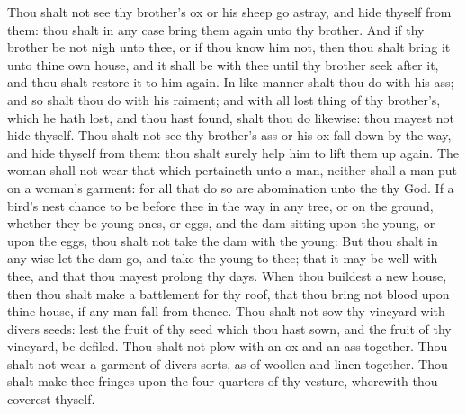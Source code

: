 \begin{biblechapter} %
\verse Thou shalt not see thy brother's ox or his sheep go astray, and hide thyself from them: thou shalt in any case bring them again unto thy brother.
\verse And if thy brother be not nigh unto thee, or if thou know him not, then thou shalt bring it unto thine own house, and it shall be with thee until thy brother seek after it, and thou shalt restore it to him again.
\verse In like manner shalt thou do with his ass; and so shalt thou do with his raiment; and with all lost thing of thy brother's, which he hath lost, and thou hast found, shalt thou do likewise: thou mayest not hide thyself.
\verse Thou shalt not see thy brother's ass or his ox fall down by the way, and hide thyself from them: thou shalt surely help him to lift them up again.
\verse The woman shall not wear that which pertaineth unto a man, neither shall a man put on a woman's garment: for all that do so are abomination unto the \LORD thy God.
\verse If a bird's nest chance to be before thee in the way in any tree, or on the ground, whether they be young ones, or eggs, and the dam sitting upon the young, or upon the eggs, thou shalt not take the dam with the young:
\verse But thou shalt in any wise let the dam go, and take the young to thee; that it may be well with thee, and that thou mayest prolong thy days.
\verse When thou buildest a new house, then thou shalt make a battlement for thy roof, that thou bring not blood upon thine house, if any man fall from thence.
\verse Thou shalt not sow thy vineyard with divers seeds: lest the fruit of thy seed which thou hast sown, and the fruit of thy vineyard, be defiled.
\verse Thou shalt not plow with an ox and an ass together.
\verse Thou shalt not wear a garment of divers sorts, as of woollen and linen together.
\verse Thou shalt make thee fringes upon the four quarters of thy vesture, wherewith thou coverest thyself.

\end{biblechapter}

